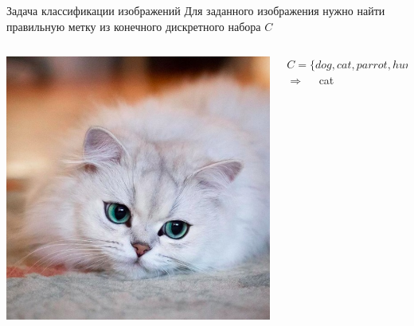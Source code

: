 \documentclass[aspectratio=169, professionalfonts]{beamer}
\begin{document}
\begin{frame}{Задача классификации изображений}
    Для заданного изображения нужно найти правильную метку
    из конечного дискретного набора \( C \)
    \vfill
    \begin{columns}
        \begin{column}{.35\linewidth}
            \includegraphics[width=\linewidth]{figures/fig7-cat.jpg}
        \end{column}
        \begin{column}{.65\linewidth}
            \( C = \{dog, cat, parrot, human, car, ninja, \ldots \} \) \\
            \hfill
            \vfill
            \( \Longrightarrow \quad \) cat
        \end{column}
    \end{columns}
\end{frame}
\end{document}
